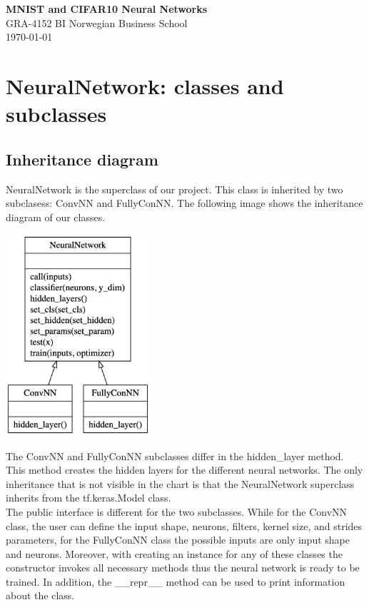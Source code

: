 \documentclass[11pt]{article}
\begin{document}
\begin{titlepage}
    \centering
    \vspace*{1cm} 
    \Huge
    \textbf{MNIST and CIFAR10 Neural Networks}
    \vspace{0.5cm} 
    \LARGE
    \\GRA-4152
    \vspace{1.5cm}
    \vfill 
    \Large
    BI Norwegian Business School\\
    \today 
\end{titlepage}


\section{NeuralNetwork: classes and subclasses}
\subsection{Inheritance diagram}
NeuralNetwork is the superclass of our project. This class is inherited by two subclasess: ConvNN and FullyConNN. The following image shows the inheritance diagram of our classes.
\begin{center}
\includegraphics[width=0.4\textwidth]{NeuralNetwork.png}
\end{center}
The ConvNN and FullyConNN subclasses differ in the hidden\_layer method. This method creates the hidden layers for the different neural networks. The only inheritance that is not visible in the chart is that the NeuralNetwork superclass inherits from the tf.keras.Model class.\\ The public interface is different for the two subclasses. While for the ConvNN class, the user can define the input shape, neurons, filters, kernel size, and strides parameters, for the FullyConNN class the possible inputs are only input shape and neurons. Moreover, with creating an instance for any of these classes the constructor invokes all necessary methods thus the neural network is ready to be trained. In addition, the \_\_repr\_\_ method can be used to print information about the class.
\end{document}
